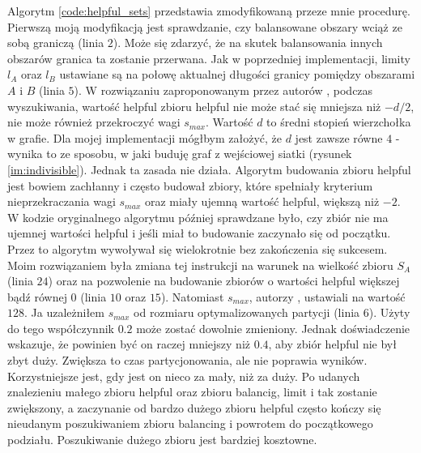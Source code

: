 Algorytm \ref{code:helpful_sets} przedstawia zmodyfikowaną przeze mnie procedurę.
Pierwszą moją modyfikacją jest sprawdzanie, czy balansowane obszary wciąż ze sobą graniczą (linia $2$).
Może się zdarzyć, że na skutek balansowania innych obszarów granica ta zostanie przerwana.
Jak w poprzedniej implementacji, limity $l_A$ oraz $l_B$ ustawiane są na połowę aktualnej długości granicy pomiędzy
obszarami $A$ i $B$ (linia $5$).
W rozwiązaniu zaproponowanym przez autorów \cite{1364754}, podczas wyszukiwania, wartość helpful zbioru helpful nie może stać się mniejsza
niż $-d/2$, nie może również przekroczyć wagi $s_{max}$.
Wartość $d$ to średni stopień wierzchołka w grafie.
Dla mojej implementacji mógłbym założyć, że $d$ jest zawsze równe $4$ - wynika to ze sposobu, w jaki buduję
graf z wejściowej siatki (rysunek \ref{im:indivisible}).
Jednak ta zasada nie działa.
Algorytm budowania zbioru helpful jest bowiem zachłanny i często budował zbiory, które spełniały kryterium nieprzekraczania
wagi $s_{max}$ oraz miały ujemną wartość helpful, większą niż $-2$.
W kodzie oryginalnego algorytmu później sprawdzane było, czy zbiór nie ma ujemnej wartości helpful i
jeśli miał to budowanie zaczynało się od początku.
Przez to algorytm wywoływał się wielokrotnie bez zakończenia się sukcesem.
Moim rozwiązaniem była zmiana tej instrukcji na warunek na wielkość zbioru $S_A$ (linia $24$) oraz na
pozwolenie na budowanie zbiorów o wartości helpful większej bądź równej $0$ (linia $10$ oraz $15$).
Natomiast $s_{max}$, autorzy \cite{article}, ustawiali na wartość $128$.
Ja uzależniłem $s_{max}$ od rozmiaru optymalizowanych partycji (linia $6$).
Użyty do tego współczynnik $0.2$ może zostać dowolnie zmieniony.
Jednak doświadczenie wskazuje, że powinien być on raczej mniejszy niż $0.4$, aby zbiór helpful nie był zbyt duży.
Zwiększa to czas partycjonowania, ale nie poprawia wyników.
Korzystniejsze jest, gdy jest on nieco za mały, niż za duży.
Po udanych znalezieniu małego zbioru helpful oraz zbioru balancig,
limit i tak zostanie zwiększony, a zaczynanie od bardzo dużego zbioru helpful często kończy się nieudanym poszukiwaniem
zbioru balancing i powrotem do początkowego podziału.
Poszukiwanie dużego zbioru jest bardziej kosztowne.

